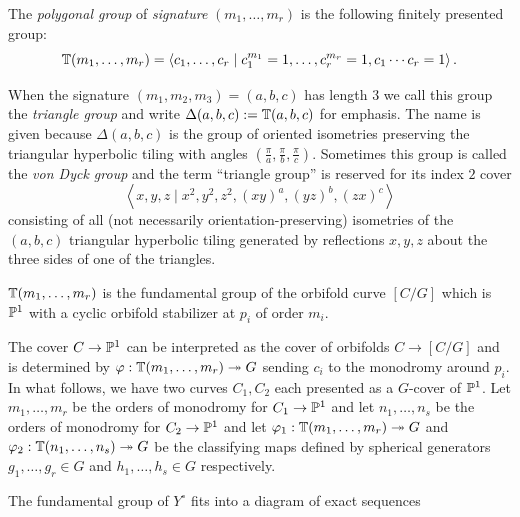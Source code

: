 \documentclass[main.tex]{subfiles}
\begin{document}
\begin{defn}
The \textit{polygonal group} of \textit{signature} $(m_1, \dots, m_r)$ is the following finitely presented group:
\[ \TT(m_1, \dots, m_r) = \left< c_1, \dots, c_r \mid c_1^{m_1} = 1, \dots, c_r^{m_r} = 1, c_1 \cdots c_r = 1 \right>. \] 
\end{defn}

When the signature $(m_1, m_2, m_3) = (a,b,c)$ has length $3$ we call this group the \textit{triangle group} and write $\Delta(a,b,c) := \TT(a,b,c)$ for emphasis. The name is given because $\Delta(a,b,c)$ is the group of oriented isometries preserving the triangular hyperbolic tiling with angles $(\tfrac{\pi}{a}, \tfrac{\pi}{b}, \tfrac{\pi}{c})$. Sometimes this group is called the \textit{von Dyck group} and the term ``triangle group'' is reserved for its index $2$ cover
\[ \left< x,y,z \mid x^2, y^2, z^2, (xy)^a, (yz)^b, (zx)^c \right> \]
consisting of all (not necessarily orientation-preserving) isometries of the $(a,b,c)$ triangular hyperbolic tiling generated by reflections $x,y,z$ about the three sides of one of the triangles.

\begin{rmk}
$\TT(m_1, \dots, m_r)$ is the fundamental group of the orbifold curve $[C / G]$ which is $\P^1$ with a cyclic orbifold stabilizer at $p_i$ of order $m_i$. 
\end{rmk}

The cover $C \to \P^1$ can be interpreted as the \etale cover of orbifolds $C \to [C / G]$ and is determined by $\varphi : \TT(m_1, \dots, m_r) \onto G$ sending $c_i$ to the monodromy around $p_i$. In what follows, we have two curves $C_1, C_2$ each presented as a $G$-cover of $\P^1$. Let $m_1, \dots, m_r$ be the orders of monodromy for $C_1 \to \P^1$ and let $n_1, \dots, n_s$ be the orders of monodromy for $C_2 \to \P^1$ and let $\varphi_1 : \TT(m_1, \dots, m_r) \onto G$ and $\varphi_2 : \TT(n_1, \dots, n_s) \onto G$ be the classifying maps defined by spherical generators $g_1, \dots, g_r \in G$ and $h_1, \dots, h_s \in G$ respectively.

\begin{lemma}
The fundamental group of $Y^{\circ}$ fits into a diagram of exact sequences
\begin{center}
\end{center}
\end{lemma}
\end{document}
